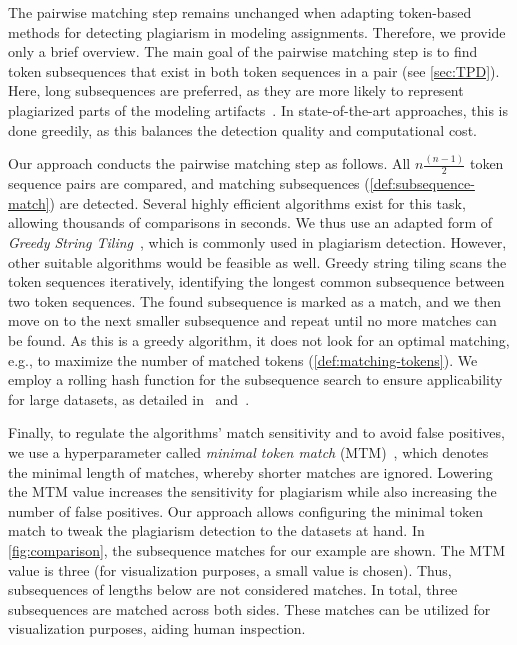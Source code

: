 \noindent
The pairwise matching step remains unchanged when adapting token-based methods for detecting plagiarism in modeling assignments. Therefore, we provide only a brief overview. The main goal of the pairwise matching step is to find token subsequences that exist in both token sequences in a pair (see \autoref{sec:TPD}). Here, long subsequences are preferred, as they are more likely to represent plagiarized parts of the modeling artifacts~\cite{prechelt2002}. In state-of-the-art approaches, this is done greedily, as this balances the detection quality and computational cost.

Our approach conducts the pairwise matching step as follows.
All \(n \frac{(n-1)}{2}\)  token sequence pairs are compared, and matching subsequences (\autoref{def:subsequence-match}) are detected.
Several highly efficient algorithms exist for this task, allowing thousands of comparisons in seconds.
We thus use an adapted form of \textit{Greedy String Tiling}~\cite{Wise1993}, which is commonly used in plagiarism detection.
However, other suitable algorithms would be feasible as well.
%
Greedy string tiling scans the token sequences iteratively, identifying the longest common subsequence between two token sequences.
The found subsequence is marked as a match, and we then move on to the next smaller subsequence and repeat until no more matches can be found. As this is a greedy algorithm, it does not look for an optimal matching, e.g., to maximize the number of matched tokens (\autoref{def:matching-tokens}).
We employ a rolling hash function for the subsequence search to ensure applicability for large datasets, as detailed in~\cite{Wise1993} and~\cite{prechelt2000}.

Finally, to regulate the algorithms' match sensitivity and to avoid false positives, we use a hyperparameter called \textit{minimal token match} (MTM)~\cite{prechelt2002}, which denotes the minimal length of matches, whereby shorter matches are ignored. Lowering the MTM value increases the sensitivity for plagiarism while also increasing the number of false positives.
Our approach allows configuring the minimal token match to tweak the plagiarism detection to the datasets at hand.
%
In \autoref{fig:comparison}, the subsequence matches for our example are shown. The MTM value is three (for visualization purposes, a small value is chosen). Thus, subsequences of lengths below are not considered matches. In total, three subsequences are matched across both sides. These matches can be utilized for visualization purposes, aiding human inspection.


